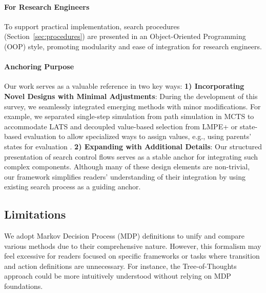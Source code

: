 \paragraph{For Research Engineers}  
To support practical implementation, search procedures (Section~\ref{sec:procedures}) are presented in an Object-Oriented Programming (OOP) style, promoting modularity and ease of integration for research engineers.

\paragraph{Anchoring Purpose}  
Our work serves as a valuable reference in two key ways:  
\textbf{1) Incorporating Novel Designs with Minimal Adjustments}: During the development of this survey, we seamlessly integrated emerging methods with minor modifications. For example, we separated single-step simulation from path simulation in MCTS to accommodate LATS \citep{zhou2024language} and decoupled value-based selection from LMPE+ or state-based evaluation to allow specialized ways to assign values, e.g., using parents' states for evaluation \citet{koh2024tree}.  
\textbf{2) Expanding with Additional Details}: 
Our structured presentation of search control flows serves as a stable anchor for integrating such complex components. 
Although many of these design elements are non-trivial, our framework simplifies readers' understanding of their integration by using existing search process as a guiding anchor.


\subsection{Limitations}  
We adopt Markov Decision Process (MDP) definitions to unify and compare various methods due to their comprehensive nature. However, this formalism may feel excessive for readers focused on specific frameworks or tasks where transition and action definitions are unnecessary. For instance, the Tree-of-Thoughts \citep{yao2023tree} approach could be more intuitively understood without relying on MDP foundations.